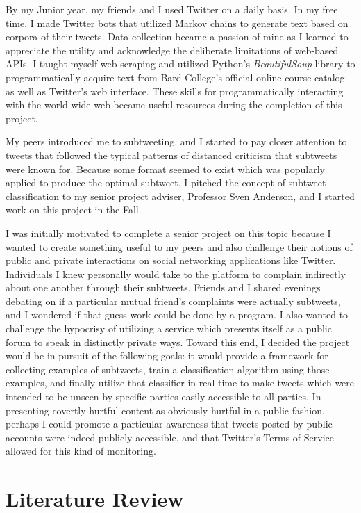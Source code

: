 \documentclass[11pt, twoside, reqno]{book}
\begin{document}
By my Junior year, my friends and I used Twitter on a daily basis. In my free time, I made Twitter bots that utilized Markov chains to generate text based on corpora of their tweets. Data collection became a passion of mine as I learned to appreciate the utility and acknowledge the deliberate limitations of web-based APIs. I taught myself web-scraping and utilized Python's \textit{BeautifulSoup} library to programmatically acquire text from Bard College's official online course catalog as well as Twitter's web interface. These skills for programmatically interacting with the world wide web became useful resources during the completion of this project.

My peers introduced me to subtweeting, and I started to pay closer attention to tweets that followed the typical patterns of distanced criticism that subtweets were known for. Because some format seemed to exist which was popularly applied to produce the optimal subtweet, I pitched the concept of subtweet classification to my senior project adviser, Professor Sven Anderson, and I started work on this project in the Fall.

I was initially motivated to complete a senior project on this topic because I wanted to create something useful to my peers and also challenge their notions of public and private interactions on social networking applications like Twitter. Individuals I knew personally would take to the platform to complain indirectly about one another through their subtweets. Friends and I shared evenings debating on if a particular mutual friend's complaints were actually subtweets, and I wondered if that guess-work could be done by a program. I also wanted to challenge the hypocrisy of utilizing a service which presents itself as a public forum to speak in distinctly private ways. Toward this end, I decided the project would be in pursuit of the following goals: it would provide a framework for collecting examples of subtweets, train a classification algorithm using those examples, and finally utilize that classifier in real time to make tweets which were intended to be unseen by specific parties easily accessible to all parties. In presenting covertly hurtful content as obviously hurtful in a public fashion, perhaps I could promote a particular awareness that tweets posted by public accounts were indeed publicly accessible, and that Twitter's Terms of Service \cite{twitter_tos} allowed for this kind of monitoring. 

\section{Literature Review}
\label{literature_review}
\end{document}
